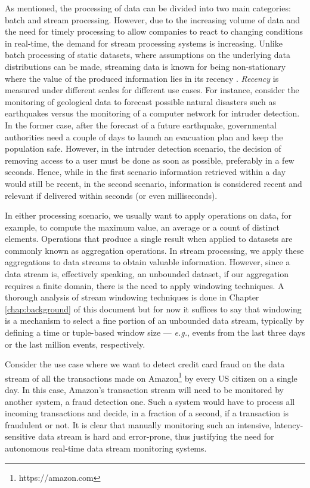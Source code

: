 As mentioned, the processing of data can be divided into two main categories: batch and stream processing. However, due to the increasing volume of data and the need for timely processing to allow companies to react to changing conditions in real-time, the demand for stream processing systems is increasing. Unlike batch processing of static datasets, where assumptions on the underlying data distributions can be made, streaming data is known for being non-stationary \cite{Gama-Knowledge-Discovery} where the value of the produced information lies in its recency \cite{Kolajo-Big-data-stream-SLR}. \textit{Recency} is measured under different scales for different use cases. For instance, consider the monitoring of geological data to forecast possible natural disasters such as earthquakes versus the monitoring of a computer network for intruder detection. In the former case, after the forecast of a future earthquake, governmental authorities need a couple of days to launch an evacuation plan and keep the population safe. However, in the intruder detection scenario, the decision of removing access to a user must be done as soon as possible, preferably in a few seconds. Hence, while in the first scenario information retrieved within a day would still be recent, in the second scenario, information is considered recent and relevant if delivered within seconds (or even milliseconds).

In either processing scenario, we usually want to apply operations on data, for example, to compute the maximum value, an average or a count of distinct elements. Operations that produce a single result when applied to datasets are commonly known as aggregation operations. In stream processing, we apply these aggregations to data streams to obtain valuable information. However, since a data stream is, effectively speaking, an unbounded dataset, if our aggregation requires a finite domain, there is the need to apply windowing techniques. A thorough analysis of stream windowing techniques is done in Chapter \ref{chap:background} of this document but for now it suffices to say that windowing is a mechanism to select a fine portion of an unbounded data stream, typically by defining a time or tuple-based window size --- \textit{e.g.}, events from the last three days or the last million events, respectively.

Consider the use case where we want to detect credit card fraud on the data stream of all the transactions made on Amazon\footnote{https://amazon.com} by every US citizen on a single day. In this case, Amazon's transaction stream will need to be monitored by another system, a fraud detection one. Such a system would have to process all incoming transactions and decide, in a fraction of a second, if a transaction is fraudulent or not. It is clear that manually monitoring such an intensive, latency-sensitive data stream is hard and error-prone, thus justifying the need for autonomous real-time data stream monitoring systems.

